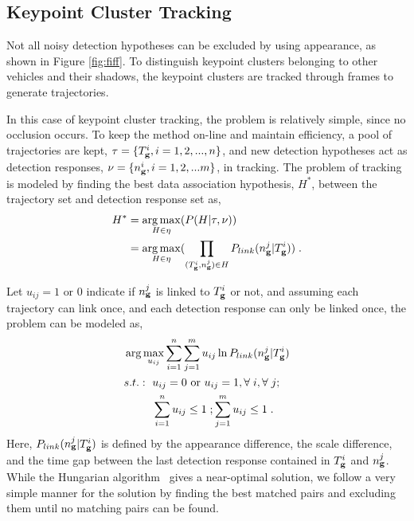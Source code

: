 \subsection{Keypoint Cluster Tracking}

Not all noisy detection hypotheses can be excluded by using appearance, as shown in Figure \ref{fig:fiff}. To distinguish keypoint clusters belonging to other vehicles and their shadows, the keypoint clusters are tracked through frames to generate trajectories.

In this case of keypoint cluster tracking, the problem is relatively simple, since no occlusion occurs. To keep the method on-line and maintain efficiency, a pool of trajectories are kept, $\tau=\{T_{\bf{g}}^i,i=1,2,...,n\}$, and new detection hypotheses act as detection responses, $\nu=\{n_{\bf{g}}^i,i=1,2,...m\}$, in tracking. The problem of tracking is modeled by finding the best data association hypothesis, $H^*$, between the trajectory set and detection response set as,
\begin{equation}
\begin{aligned}
{H^*} &= \mathop {\arg \max }\limits_{H \in \eta
} (P(H|\tau,\nu )) \\
&= \mathop {\arg \max }\limits_{H \in \eta }
(\prod\limits_{(T_{\bf{g}}^i,n_{\bf{g}}^j) \in H} {P_{link}(n_{\bf{g}}^j|T_{\bf{g}}^i)} ) \;.
\end{aligned}
\label{eq3}
\end{equation}

Let $u_{ij}=1 \mbox{ or } 0$ indicate if $n_{\bf{g}}^j$ is linked to $T_{\bf{g}}^i$ or not, and assuming each trajectory can link once, and each detection response can only be linked once, the problem can be modeled as,
\[
\begin{aligned}
&\arg \max\limits_{u_{ij}} \sum\limits_{i = 1}^n \sum\limits_{j = 1}^m u_{ij} \ln P_{link}(n_{\bf{g}}^j|T_{\bf{g}}^i)\\
&
\begin{aligned}
    s.t.:\mbox{ }&u_{ij}=0\mbox{ or }u_{ij}=1,\forall\;i,\forall\;j;\\
    &\sum\limits_{i = 1}^n {u_{ij}} \leq 1\;; \sum\limits_{j = 1}^m {u_{ij}}\leq 1\;.
\end{aligned}
\end{aligned}
\]
Here, $P_{link}(n_{\bf{g}}^j|T_{\bf{g}}^i)$ is defined by the appearance difference, the scale difference, and the time gap between the last detection response contained in $T_{\bf{g}}^i$ and $n_{\bf{g}}^j$. While the Hungarian algorithm~\citep{ha} gives a near-optimal solution, we follow a very simple manner for the solution by finding the best matched pairs and excluding them until no matching pairs can be found.

